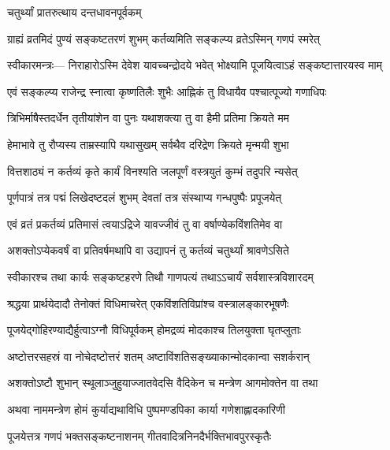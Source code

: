 
\onelineshloka
{चतुर्थ्यां प्रातरुत्थाय दन्तधावनपूर्वकम्} %


\twolineshloka
{ग्राह्यं व्रतमिदं पुण्यं सङ्कष्टतरणं शुभम्}
{कर्तव्यमिति सङ्कल्प्य व्रतेऽस्मिन् गणपं स्मरेत्} %


स्वीकारमन्त्रः—\hfill 
\twolineshloka
{निराहारोऽस्मि देवेश यावच्चन्द्रोदये भवेत्}
{भोक्ष्यामि पूजयित्वाऽहं सङ्कष्टात्तारयस्व माम्} %


\twolineshloka
{एवं सङ्कल्प्य राजेन्द्र स्नात्वा कृष्णतिलैः शुभैः}
{आह्निकं तु विधायैव पश्चात्पूज्यो गणाधिपः} %


\twolineshloka
{त्रिभिर्माषैस्तदर्धेन तृतीयांशेन वा पुनः}
{यथाशक्त्या तु वा हैमी प्रतिमा क्रियते मम} %


\twolineshloka
{हेमाभावे तु रौप्यस्य ताम्रस्यापि यथासुखम्}
{सर्वथैव दरिद्रेण क्रियते मृन्मयी शुभा} %


\twolineshloka
{वित्तशाठ्यं न कर्तव्यं कृते कार्यं विनश्यति}
{जलपूर्णं वस्त्रयुतं कुम्भं तदुपरि न्यसेत्} %


\twolineshloka
{पूर्णपात्रं तत्र पद्मं लिखेदष्टदलं शुभम्}
{देवतां तत्र संस्थाप्य गन्धपुष्पैः प्रपूजयेत्} %


\twolineshloka
{एवं व्रतं प्रकर्तव्यं प्रतिमासं त्वयाऽद्रिजे}
{यावज्जीवं तु वा वर्षाण्येकविंशतिमेव वा} %


\twolineshloka
{अशक्तोऽप्येकवर्षं वा प्रतिवर्षमथापि वा}
{उद्यापनं तु कर्तव्यं चतुर्थ्यां श्रावणेऽसिते} %


\twolineshloka
{स्वीकारश्च तथा कार्यः सङ्कष्टहरणे तिथौ}
{गाणपत्यं तथाऽऽचार्यं सर्वशास्त्रविशारदम्} %


\twolineshloka
{श्रद्धया प्रार्थयेदादौ तेनोक्तं विधिमाचरेत्}
{एकविंशतिविप्रांश्च वस्त्रालङ्कारभूषणैः} %


\twolineshloka
{पूजयेद्गोहिरण्याद्यैर्हुत्वाऽग्नौ विधिपूर्वकम्}
{होमद्रव्यं मोदकाश्च तिलयुक्ता घृतप्लुताः} %


\twolineshloka
{अष्टोत्तरसहस्रं वा नोचेदष्टोत्तरं शतम्}
{अष्टाविंशतिसङ्ख्याकान्मोदकान्वा सशर्करान्} %


\twolineshloka
{अशक्तोऽष्टौ शुभान् स्थूलाञ्जुहुयाज्जातवेदसि}
{वैदिकेन च मन्त्रेण आगमोक्तेन वा तथा} %


\twolineshloka
{अथवा नाममन्त्रेण होमं कुर्याद्यथाविधि}
{पुष्पमण्डपिका कार्या गणेशाह्लादकारिणी} %


\twolineshloka
{पूजयेत्तत्र गणपं भक्तसङ्कष्टनाशनम्}
{गीतवादित्रनिनदैर्भक्तिभावपुरस्कृतैः} %


